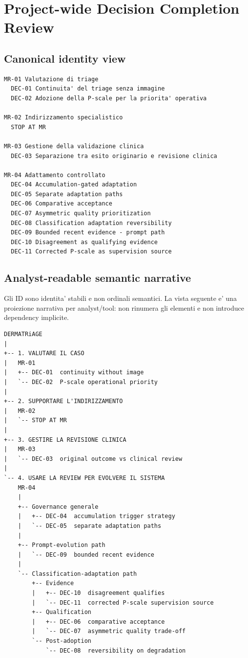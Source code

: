 \documentclass[11pt,a4paper]{article}
\begin{document}
\clearpage
\section{Project-wide Decision Completion Review}
\subsection{Canonical identity view}
\begin{lstlisting}
MR-01 Valutazione di triage
  DEC-01 Continuita' del triage senza immagine
  DEC-02 Adozione della P-scale per la priorita' operativa

MR-02 Indirizzamento specialistico
  STOP AT MR

MR-03 Gestione della validazione clinica
  DEC-03 Separazione tra esito originario e revisione clinica

MR-04 Adattamento controllato
  DEC-04 Accumulation-gated adaptation
  DEC-05 Separate adaptation paths
  DEC-06 Comparative acceptance
  DEC-07 Asymmetric quality prioritization
  DEC-08 Classification adaptation reversibility
  DEC-09 Bounded recent evidence - prompt path
  DEC-10 Disagreement as qualifying evidence
  DEC-11 Corrected P-scale as supervision source
\end{lstlisting}

\subsection{Analyst-readable semantic narrative}
\begin{ddtaprinciple}[title={Stable identity != semantic reading order}]
Gli ID sono identita' stabili e non ordinali semantici. La vista seguente e' una proiezione narrativa per analyst/tool: non rinumera gli elementi e non introduce dependency implicite.
\end{ddtaprinciple}

\begin{lstlisting}
DERMATRiAGE
|
+-- 1. VALUTARE IL CASO
|   MR-01
|   +-- DEC-01  continuity without image
|   `-- DEC-02  P-scale operational priority
|
+-- 2. SUPPORTARE L'INDIRIZZAMENTO
|   MR-02
|   `-- STOP AT MR
|
+-- 3. GESTIRE LA REVISIONE CLINICA
|   MR-03
|   `-- DEC-03  original outcome vs clinical review
|
`-- 4. USARE LA REVIEW PER EVOLVERE IL SISTEMA
    MR-04
    |
    +-- Governance generale
    |   +-- DEC-04  accumulation trigger strategy
    |   `-- DEC-05  separate adaptation paths
    |
    +-- Prompt-evolution path
    |   `-- DEC-09  bounded recent evidence
    |
    `-- Classification-adaptation path
        +-- Evidence
        |   +-- DEC-10  disagreement qualifies
        |   `-- DEC-11  corrected P-scale supervision source
        +-- Qualification
        |   +-- DEC-06  comparative acceptance
        |   `-- DEC-07  asymmetric quality trade-off
        `-- Post-adoption
            `-- DEC-08  reversibility on degradation
\end{lstlisting}
\end{document}
